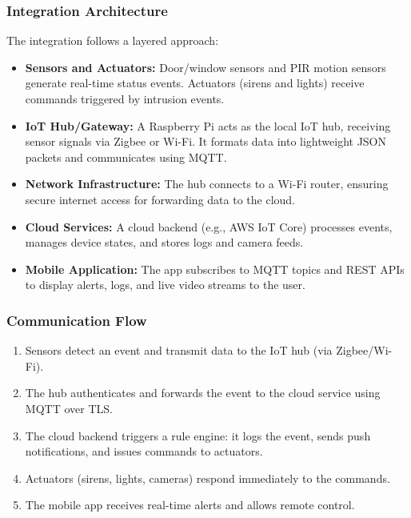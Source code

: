 \documentclass[conference]{IEEEtran}
\begin{document}
\subsubsection{Integration Architecture}
The integration follows a layered approach:
\begin{itemize}
    \item \textbf{Sensors and Actuators:} Door/window sensors and PIR motion sensors generate real-time status events. Actuators (sirens and lights) receive commands triggered by intrusion events.
    \item \textbf{IoT Hub/Gateway:} A Raspberry Pi acts as the local IoT hub, receiving sensor signals via Zigbee or Wi-Fi. It formats data into lightweight JSON packets and communicates using MQTT.
    \item \textbf{Network Infrastructure:} The hub connects to a Wi-Fi router, ensuring secure internet access for forwarding data to the cloud.
    \item \textbf{Cloud Services:} A cloud backend (e.g., AWS IoT Core) processes events, manages device states, and stores logs and camera feeds.
    \item \textbf{Mobile Application:} The app subscribes to MQTT topics and REST APIs to display alerts, logs, and live video streams to the user.
\end{itemize}

\subsubsection{Communication Flow}
\begin{enumerate}
    \item Sensors detect an event and transmit data to the IoT hub (via Zigbee/Wi-Fi).
    \item The hub authenticates and forwards the event to the cloud service using MQTT over TLS.
    \item The cloud backend triggers a rule engine: it logs the event, sends push notifications, and issues commands to actuators.
    \item Actuators (sirens, lights, cameras) respond immediately to the commands.
    \item The mobile app receives real-time alerts and allows remote control.
\end{enumerate}
\end{document}
